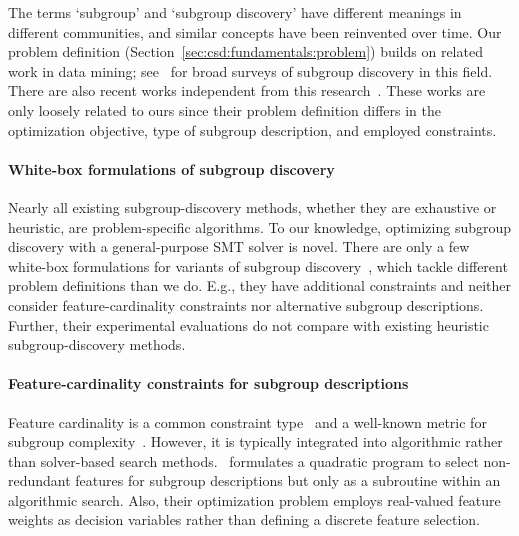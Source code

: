 \documentclass[acmsmall]{acmart} %
\theoremstyle{acmplain}
\theoremstyle{acmdefinition}
\begin{document}
The terms `subgroup' and `subgroup discovery' have different meanings in different communities, and similar concepts have been reinvented over time.
Our problem definition (Section~\ref{sec:csd:fundamentals:problem}) builds on related work in data mining; see~\cite{atzmueller2015subgroup, helal2016subgroup, herrera2011overview, ventura2018subgroup} for broad surveys of subgroup discovery in this field.
There are also recent works independent from this research~\cite{asudeh2019assessing, lawless2022interpretable, pastor2021looking, sagadeeva2021sliceline}.
These works are only loosely related to ours since their problem definition differs in the optimization objective, type of subgroup description, and employed constraints.

\paragraph{White-box formulations of subgroup discovery}

Nearly all existing subgroup-discovery methods, whether they are exhaustive or heuristic, are problem-specific algorithms.
To our knowledge, optimizing subgroup discovery with a general-purpose SMT solver is novel.
There are only a few white-box formulations for variants of subgroup discovery~\cite{bonates2008maximum, eckstein2002maximum, guns2011itemset, koccak2020exploiting, louveaux2014combinatorial}, which tackle different problem definitions than we do.
E.g., they have additional constraints and neither consider feature-cardinality constraints nor alternative subgroup descriptions.
Further, their experimental evaluations do not compare with existing heuristic subgroup-discovery methods.

\paragraph{Feature-cardinality constraints for subgroup descriptions}

Feature cardinality is a common constraint type~\cite{meeng2021real} and a well-known metric for subgroup complexity~\cite{herrera2011overview}.
However, it is typically integrated into algorithmic rather than solver-based search methods.
\cite{li2015efficient}~formulates a quadratic program to select non-redundant features for subgroup descriptions but only as a subroutine within an algorithmic search.
Also, their optimization problem employs real-valued feature weights as decision variables rather than defining a discrete feature selection.
\end{document}

